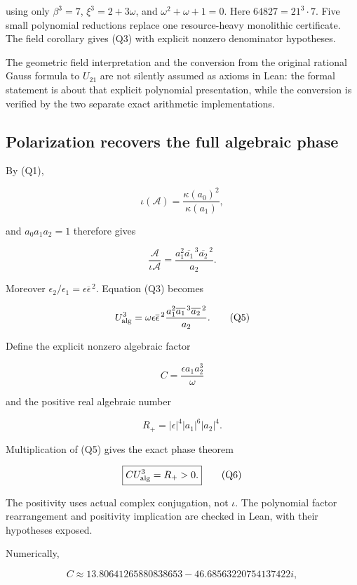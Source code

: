 using only \(\beta^3=7\), \(\xi^3=2+3\omega\), and
\(\omega^2+\omega+1=0\). Here \(64827=21^3\cdot7\). Five small
polynomial reductions replace one resource-heavy monolithic certificate.
The field corollary gives (Q3) with explicit nonzero denominator
hypotheses.

The geometric field interpretation and the conversion from the original
rational Gauss formula to \(U_{21}\) are not silently assumed as axioms
in Lean: the formal statement is about that explicit polynomial
presentation, while the conversion is verified by the two separate exact
arithmetic implementations.

\hypertarget{Q-polarization-recovers-the-full-algebraic-phase}{%
\subsection{Polarization recovers the full algebraic
phase}\label{Q-polarization-recovers-the-full-algebraic-phase}}

By (Q1),

\[
 \iota(\mathcal A)=\frac{\kappa(a_0)^2}{\kappa(a_1)},
\]

and \(a_0a_1a_2=1\) therefore gives

\[
 \frac{\mathcal A}{\iota\mathcal A}
  =\frac{a_1^2\overline{a_1}^{\,3}\overline{a_2}^{\,2}}{a_2}.
\]

Moreover \(\epsilon_2/\epsilon_1=\epsilon\overline\epsilon^{\,2}\).
Equation (Q3) becomes

\[
 U_{\rm alg}^3=
 \omega\epsilon\overline\epsilon^{\,2}
 \frac{a_1^2\overline{a_1}^{\,3}\overline{a_2}^{\,2}}{a_2}. \tag{Q5}
\]

Define the explicit nonzero algebraic factor

\[
 \boxed{C=\frac{\epsilon a_1a_2^3}{\omega}}
\]

and the positive real algebraic number

\[
 R_+=|\epsilon|^4|a_1|^6|a_2|^4.
\]

Multiplication of (Q5) gives the exact phase theorem

\[
 \boxed{C U_{\rm alg}^3=R_+>0.} \tag{Q6}
\]

The positivity uses actual complex conjugation, not \(\iota\). The
polynomial factor rearrangement and positivity implication are checked
in Lean, with their hypotheses exposed.

Numerically,

\[
 C\approx13.80641265880838653-46.68563220754137422i,
\]

